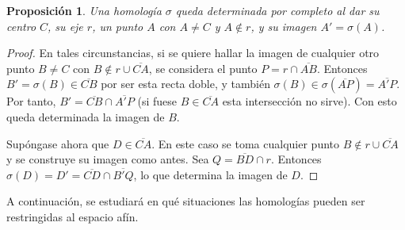 \documentclass[12pt]{report}
\newtheorem{proposition}{Proposición}[chapter]
\theoremstyle{definition}
\theoremstyle{definition}
\theoremstyle{remark}
\begin{document}
\begin{proposition}
\label{prop3.3.}
Una homología $\sigma$ queda determinada por completo al dar su centro $C$, su eje $r$, un punto $A$ con $A \neq C$ y $A \notin r$, y su imagen $A' = \sigma(A)$.
\end{proposition}

\begin{proof}
En tales circunstancias, si se quiere hallar la imagen de cualquier otro punto $B \neq C$ con $B \notin r \cup \overline{CA}$, se considera el punto $P = r \cap \overline{AB}$. Entonces $B' = \sigma(B) \in \overline{CB}$ por ser esta recta doble, y también $\sigma(B) \in \sigma(\overline{AP}) = \overline{A'P}$. Por tanto, $B' = \overline{CB} \cap \overline{A'P}$ (si fuese $B \in \overline{CA}$ esta intersección no sirve). Con esto queda determinada la imagen de $B$.

\vspace{2mm}
Supóngase ahora que $D \in \overline{CA}$. En este caso se toma cualquier punto $B \notin r \cup \overline{CA}$ y se construye su imagen como antes. Sea $Q = \overline{BD} \cap r$. Entonces $\sigma(D) = D' = \overline{CD} \cap \overline{B'Q}$, lo que determina la imagen de $D$.
\end{proof}

A continuación, se estudiará en qué situaciones las homologías pueden ser restringidas al espacio afín.
\end{document}
